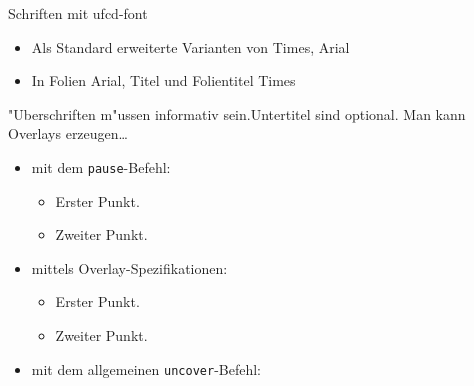\documentclass[german,english,mainlanguage=german]{beamer}
\begin{document}
\begin{frame}{Schriften mit ufcd-font}
\label{fp}
  \begin{itemize}
  \item Als Standard erweiterte Varianten von Times, Arial
  \item In Folien Arial, Titel und Folientitel Times
  \end{itemize}
\end{frame}

\begin{frame}{"Uberschriften m"ussen informativ sein.}{Untertitel sind optional.}
  Man kann Overlays erzeugen\dots
  \begin{itemize}
  \item mit dem \texttt{pause}-Befehl:
    \begin{itemize}
    \item
      Erster Punkt.
      \pause
    \item
      Zweiter Punkt.
    \end{itemize}
  \item
    mittels Overlay-Spezifikationen:
    \begin{itemize}
    \item<3->
      Erster Punkt.
    \item<4->
      Zweiter Punkt.
    \end{itemize}
  \item
    mit dem allgemeinen \texttt{uncover}-Befehl:
    \begin{itemize}
    \end{itemize}
  \end{itemize}
\end{frame}
\end{document}
